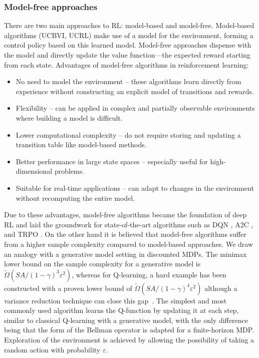 \documentclass{article}
\numberwithin{equation}{section}
\begin{document}
\subsubsection{Model-free approaches}

There are two main approaches to RL: model-based and model-free. Model-based algorithms (UCBVI, UCRL) make use of a model for the environment, forming a control policy based on this learned model. Model-free approaches dispense with the model and directly update the value function—the expected reward starting from each state. 
Advantages of model-free algorithms in reinforcement learning:
\begin{itemize}
    \item No need to model the environment – these algorithms learn  directly from experience without constructing an explicit model of transitions and rewards.
    \item Flexibility – can be applied in complex and partially observable environments where building a model is difficult.
    \item Lower computational complexity – do not require storing and updating a transition table like model-based methods.
    \item Better performance in large state spaces – especially useful for high-dimensional problems.
    \item Suitable for real-time applications – can adapt to changes in the environment without recomputing the entire model.
\end{itemize}
Due to these advantages, model-free algorithms became the foundation of deep RL and laid the groundwork for state-of-the-art algorithms such as DQN \cite{mnih2015humanlevel}, A2C \cite{mnih2016a3c}, and TRPO \cite{schulman2015trpo}. On the other hand it is believed that model-free algorithms suffer from a higher sample complexity compared to model-based approaches. We draw an analogy with a generative model setting in discounted MDPs. The minimax lower bound on the sample complexity for a generative model is  \(\widetilde{{\Omega}}(SA/(1-\gamma)^3\varepsilon^2)\), whereas for Q-learning, a hard example has been constructed with a proven lower bound of \(\widetilde{\Omega}(SA/(1-\gamma)^4\varepsilon^2)\) although a variance reduction technique can close this gap~\cite{wainwright2019variance}. The simplest and most commonly used algorithm learns the Q-function by updating it at each step, similar to classical Q-learning with a generative model, with the only difference being that the form of the Bellman operator is adapted for a finite-horizon MDP. Exploration of the environment is achieved by allowing the possibility of taking a random action with probability $\varepsilon$.
\end{document}

